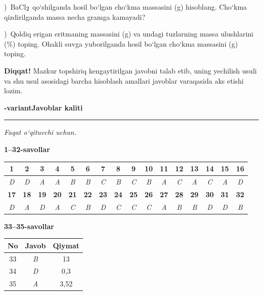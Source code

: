 \documentclass[11pt,a4paper]{article}
\renewcommand{\textsubscript}[1]{\ensuremath{_{\text{\fontsize{8}{8}\selectfont #1}}}}
\newcommand{\qsep}{\par\vspace{13pt}}
\newcommand{\diqqat}[1]{\par\smallskip\noindent\textbf{Diqqat!} #1\par\medskip}
\begin{document}
)\ BaCl\textsubscript{2} qo`shilganda hosil bo`lgan cho`kma massasini (g) hisoblang. Cho`kma qizdirilganda massa necha gramga kamayadi?\par
{})\ Qoldiq erigan eritmaning massasini (g) va undagi tuzlarning massa ulushlarini (\%) toping. Ohakli suvga yuborilganda hosil bo`lgan cho`kma massasini (g) toping.\par
\diqqat{Mazkur topshiriq kengaytirilgan javobni talab etib, uning yechilish usuli va shu usul asosidagi barcha hisoblash amallari javoblar varaqasida aks etishi lozim.}\qsep
\newpage
\noindent\textbf{\fontsize{13}{15}-variant}\hfill \textbf{Javoblar kaliti}\par\smallskip\hrule\smallskip
\textit{Faqat o`qituvchi uchun.}\par\medskip
\noindent\textbf{1--32-savollar}\par\smallskip
\noindent\begin{tabular}{|c|c|c|c|c|c|c|c|c|c|c|c|c|c|c|c|}\hline
\textbf{1} & \textbf{2} & \textbf{3} & \textbf{4} & \textbf{5} & \textbf{6} & \textbf{7} & \textbf{8} & \textbf{9} & \textbf{10} & \textbf{11} & \textbf{12} & \textbf{13} & \textbf{14} & \textbf{15} & \textbf{16}\\\hline
\textsl{D} & \textsl{D} & \textsl{A} & \textsl{A} & \textsl{B} & \textsl{B} & \textsl{C} & \textsl{B} & \textsl{C} & \textsl{B} & \textsl{A} & \textsl{C} & \textsl{A} & \textsl{C} & \textsl{A} & \textsl{D}\\\hline
\textbf{17} & \textbf{18} & \textbf{19} & \textbf{20} & \textbf{21} & \textbf{22} & \textbf{23} & \textbf{24} & \textbf{25} & \textbf{26} & \textbf{27} & \textbf{28} & \textbf{29} & \textbf{30} & \textbf{31} & \textbf{32}\\\hline
\textsl{D} & \textsl{A} & \textsl{D} & \textsl{A} & \textsl{C} & \textsl{B} & \textsl{D} & \textsl{C} & \textsl{C} & \textsl{C} & \textsl{A} & \textsl{B} & \textsl{B} & \textsl{D} & \textsl{D} & \textsl{B}\\\hline
\end{tabular}\par\medskip
\noindent\textbf{33--35-savollar}\par\smallskip
\noindent\begin{tabular}{|c|c|c|}\hline \textbf{No} & \textbf{Javob} & \textbf{Qiymat}\\\hline
33 & \textsl{B} & 13\\\hline
34 & \textsl{D} & 0,3\\\hline
35 & \textsl{A} & 3,52\\\hline
\end{tabular}\par\medskip
\end{document}
